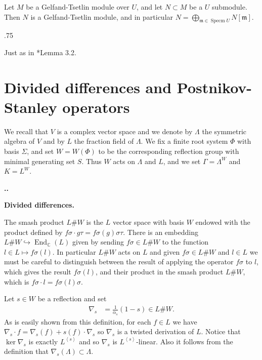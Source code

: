 \documentclass[11pt,fleqn]{amsart}
\makeatletter
\renewcommand\thesection{\arabic{section}}
\renewcommand\proofname{Proof}
\renewenvironment{proof}[1][\textit{\proofname}]{\par
 \pushQED{\qed}%
 \normalfont \topsep.75\paraskip\relax
 \trivlist
 \item[\hskip\labelsep
 \itshape
 #1\@addpunct{.}]\ignorespaces
}{%
 \popQED\endtrivlist\@endpefalse
}
\newcounter{para}[section]
\renewcommand\thepara{\thesection.\arabic{para}}
\def\paragraph{%
 \noindent
 \refstepcounter{para}%
 \textbf{\thepara.}\hspace{1ex}%
}
\newcommand\about[1]{%
 {\bfseries#1.}%
}
\newcommand\CC{\mathbb C}
\newcommand\m{\mathfrak m}
\newcommand\vectspan[1]{\left\langle #1 \right\rangle}
\DeclareMathOperator\Specm{Specm}
\DeclareMathOperator\End{End}
\makeatother
\begin{document}
\begin{Lemma}
\label{L:sub-gt}
Let $M$ be a Gelfand-Tsetlin module over $U$, and let $N \subset M$ be a $U$
submodule. Then $N$ is a Gelfand-Tsetlin module, and in particular $N = 
\bigoplus_{\m \in \Specm U} N[\m]$.
\end{Lemma}
\begin{proof}
Just as in \cite{FGR-generic-irreducible}*{Lemma 3.2}.
\end{proof}

\section{Divided differences and Postnikov-Stanley operators}
We recall that $V$ is a complex vector space and we denote by $\Lambda$ the 
symmetric algebra of $V$ and by $L$ the fraction field of $\Lambda$. We fix
a finite root system $\Phi$ with basis $\Sigma$, and set $W = W(\Phi)$ to be
the corresponding reflection group with minimal generating set $S$. Thus $W$ 
acts on $\Lambda$ and $L$, and we set $\Gamma = \Lambda^W$ and $K = L^W$.

\paragraph
\about{Divided differences}
The smash product $L \# W$ is the $L$ vector space with basis $W$ endowed 
with the product defined by $f \sigma \cdot g \tau = f \sigma(g) \sigma \tau$.
There is an embedding $L \# W \hookrightarrow \End_\CC(L)$ given by sending
$f \sigma \in L \# W$ to the function $l \in L \mapsto f\sigma(l)$.
In particular $L \# W$ acts on $L$ and given $f\sigma \in L\# W$ and $l \in 
L$ we must be careful to distinguish between the result of applying the 
operator $f \sigma$ to $l$, which gives the result $f\sigma(l)$, and their 
product in the smash product $L \#W$, which is $f \sigma \cdot l = f\sigma(l) 
\sigma$. 

Let $s\in W$ be a reflection and set
\begin{align*}
\nabla_s 
	&= \frac{1}{\alpha_s}(1-s) \in L \# W.
\end{align*}
As is easily shown from this definition, for each $f \in L$ we have $\nabla_s 
\cdot f = \nabla_s(f) + s(f)\cdot \nabla_s$ so $\nabla_s$ is a twisted 
derivation of $L$. Notice that $\ker \nabla_s$ is exactly $L^{\vectspan s}$ 
and so $\nabla_s$ is $L^{\vectspan s}$-linear. Also it follows from the
definition that $\nabla_s(\Lambda) \subset \Lambda$.
\end{document}
